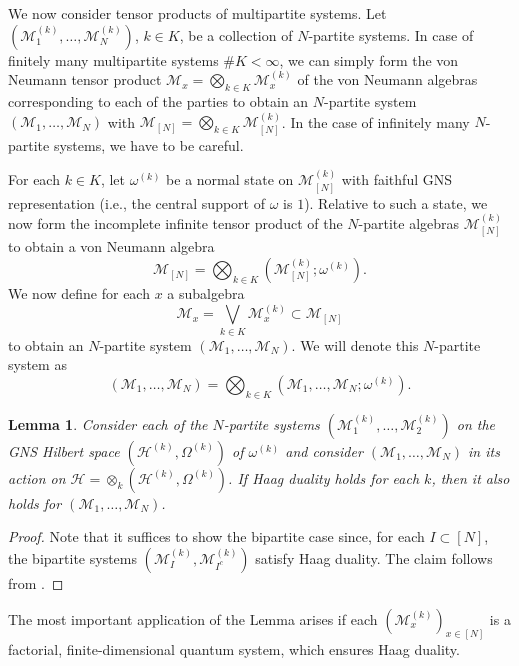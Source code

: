 \documentclass[a4paper, 10pt, onecolumn, accepted=2025-07-22]{quantumarticle}
\newtheorem{lemma}[theorem]{Lemma}
\theoremstyle{definition}
\newcommand{\oo}{\infty}
\newcommand{\mc}{\mathcal}
\newcommand{\up}[1]{^{(#1)}}
\def\H{{\mc H}}
\def\M{{\mc M}}
\newcommand*{\1}{\text{\usefont{U}{bbold}{m}{n}1}}
\begin{document}
We now consider tensor products of multipartite systems.
Let $(\M\up k_1,\ldots,\M\up k_N)$, $k\in K$, be a collection of $N$-partite systems.
In case of finitely many multipartite systems $\# K<\oo$, we can simply form the von Neumann tensor product $\M_x=\bigotimes_{k\in K}\M\up k_x$ of the von Neumann algebras corresponding to each of the parties to obtain an $N$-partite system $(\M_1,\ldots,\M_N)$ with $\M_{[N]} = \bigotimes_{k\in K} \M_{[N]}\up k$.
In the case of infinitely many $N$-partite systems, we have to be careful.

For each $k\in K$, let $\omega\up k$ be a normal state on $\M_{[N]}\up k$ with faithful GNS representation (i.e., the central support of $\omega$ is $1$).
Relative to such a state, we now form the incomplete infinite tensor product of the $N$-partite algebras $\M_{[N]}\up k$ to obtain a von Neumann algebra
\begin{equation}
    \M_{[N]} = \bigotimes_{k\in K} (\M_{[N]}\up{k};\omega\up k).
\end{equation}
We now define for each $x$ a subalgebra 
\begin{equation}
    \M_x = \bigvee_{k\in K} \M_x\up k \subset \M_{[N]}
\end{equation}
to obtain an $N$-partite system $(\M_1,\ldots,\M_N)$. We will denote this $N$-partite system as
\begin{equation}
    (\M_1,\ldots,\M_N) = \bigotimes_{k\in K} (\M_1,\ldots, \M_N ; \omega\up k).
\end{equation}

\begin{lemma}\label{lem:haag}
    Consider each of the $N$-partite systems $(\M_1\up k,\ldots,\M_2\up k)$ on the GNS Hilbert space $(\H\up k,\Omega\up k)$ of $\omega\up k$ and consider $(\M_1,\ldots,\M_N)$ in its action on $\H=\otimes_k (\H\up k,\Omega\up k)$.
    If Haag duality holds for each $k$, then it also holds for $(\M_1,\ldots,\M_N)$.
\end{lemma}

\begin{proof}
    Note that it suffices to show the bipartite case since, for each $I \subset [N]$, the bipartite systems $(\M_I\up k,\M_{I^c}\up k)$ satisfy Haag duality.
    The claim follows from \cite[Thm. XIV.1.9]{takesaki3}.
\end{proof}

The most important application of the Lemma arises if each $(\M\up{k}_x)_{x\in[N]}$ is a factorial, finite-dimensional quantum system, which ensures Haag duality.
\end{document}
